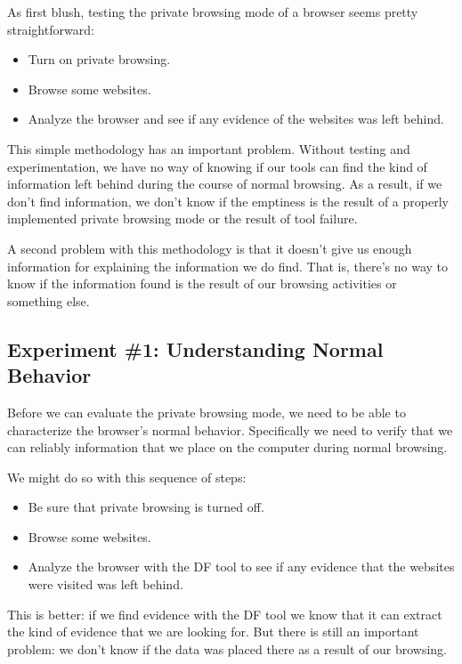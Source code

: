 As first blush, testing the private browsing mode of a browser seems
pretty straightforward:

\begin{itemize}
\item Turn on private browsing.
\item Browse some websites.
\item Analyze the browser and see if any evidence of the websites was
  left behind. 
\end{itemize}

This simple methodology has an important problem. Without testing and
experimentation, we have no way of knowing if our tools can find the
kind of information left behind during the course of normal
browsing. As a result, if we don't find information, we don't know if
the emptiness is the result of a properly implemented private browsing
mode or the result of tool failure.

A second problem with this methodology is that it doesn't give us
enough information for explaining the information we do find. That is,
there's no way to know if the information found is the result of our
browsing activities or something else.

\subsection{Experiment \#1: Understanding Normal Behavior}

Before we can evaluate the private browsing mode, we need to be able
to characterize the browser's normal behavior. Specifically we need to
verify that we can reliably information that we place on the computer
during normal browsing.

We might do so with this sequence of steps:

\begin{itemize}
\item Be sure that private browsing is turned off.
\item Browse some websites.
\item Analyze the browser with the DF tool to see if any evidence that the websites
  were visited was left behind. 
\end{itemize}

This is better: if we find evidence with the DF tool we know that it
can extract the kind of evidence that we are looking for. But there
is still an important problem: we don't know if the data was placed there
as a result of our browsing.

